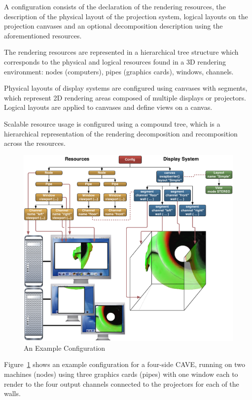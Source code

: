 \documentclass[10pt,a4]{scrartcl}
\newcommand{\fig}[1]{Figure~\ref{#1}}
\begin{document}
A configuration consists of the declaration of the rendering resources, the
description of the physical layout of the projection system, logical layouts on
the projection canvases and an optional decomposition description using the
aforementioned resources.

The rendering resources are represented in a hierarchical tree structure
which corresponds to the physical and logical resources found in a 3D
rendering environment: nodes (computers), pipes (graphics cards),
windows, channels. 

Physical layouts of display systems are configured using canvases with
segments, which represent 2D rendering areas composed of multiple
displays or projectors. Logical layouts are applied to canvases and
define views on a canvas.

Scalable resource usage is configured using a compound tree, which is a
hierarchical representation of the rendering decomposition and
recomposition across the resources.

\begin{figure}[ht!]\center
  \includegraphics[width=\textwidth]{images/cave.pdf}
  {\caption{\label{fConfig}An Example Configuration}}
\end{figure}

\fig{fConfig} shows an example configuration for a four-side
CAVE, running on two machines (nodes) using three graphics
cards (pipes) with one window each to render to the four output channels
connected to the projectors for each of the walls.
\end{document}
